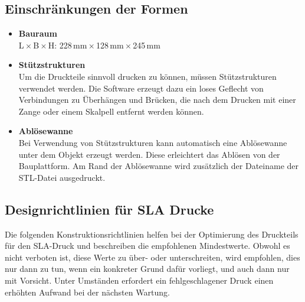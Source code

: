 \documentclass{\basedir/fablab-document}
\begin{document}
\subsection{Einschränkungen der Formen}
\begin{itemize}%
    \item \textbf{Bauraum}\\L\,$\times$\,B\,$\times$\,H\@: 228\,mm\,$\times$\,128\,mm\,$\times$\,245\,mm
    \item \textbf{Stützstrukturen}\\Um die Druckteile sinnvoll drucken zu können, müssen Stützstrukturen verwendet werden. Die Software erzeugt dazu ein loses Geflecht von Verbindungen zu Überhängen und Brücken, die nach dem Drucken mit einer Zange oder einem Skalpell entfernt werden können.
    \item \textbf{Ablösewanne}\\Bei Verwendung von Stützstrukturen kann automatisch eine Ablösewanne unter dem Objekt erzeugt werden. Diese erleichtert das Ablösen von der Bauplattform. Am Rand der Ablösewanne wird zusätzlich der Dateiname der STL-Datei ausgedruckt.
\end{itemize}

\newpage

\subsection{Designrichtlinien für SLA Drucke}

Die folgenden Konstruktionsrichtlinien helfen bei der Optimierung des Druckteils für den SLA-Druck und beschreiben die empfohlenen Mindestwerte. Obwohl es nicht verboten ist, diese Werte zu über- oder unterschreiten, wird empfohlen, dies nur dann zu tun, wenn ein konkreter Grund dafür vorliegt, und auch dann nur mit Vorsicht. Unter Umständen erfordert ein fehlgeschlagener Druck einen erhöhten Aufwand bei der nächsten Wartung. \\
\end{document}

